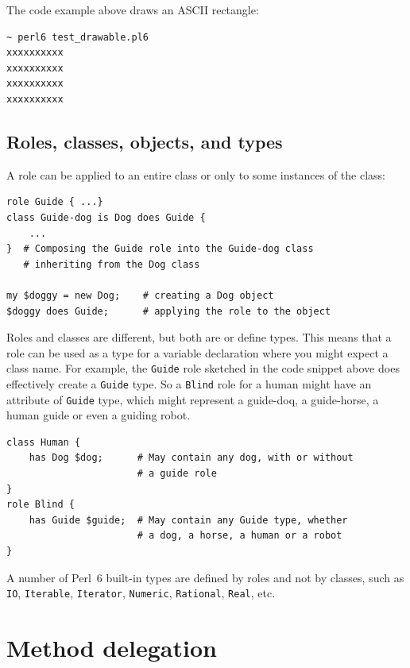 The code example above draws an ASCII rectangle:
\begin{verbatim}
~ perl6 test_drawable.pl6
xxxxxxxxxx
xxxxxxxxxx
xxxxxxxxxx
xxxxxxxxxx
\end{verbatim}

\subsection{Roles, classes, objects, and types}

A role can be applied to an entire class or only to some 
instances of the class:

\begin{verbatim}
role Guide { ...}
class Guide-dog is Dog does Guide { 
    ... 
}  # Composing the Guide role into the Guide-dog class
   # inheriting from the Dog class

my $doggy = new Dog;    # creating a Dog object
$doggy does Guide;      # applying the role to the object
\end{verbatim}

Roles and classes are different, but both are or define types.
This means that a role can be used as a type for a variable 
declaration where you might expect a class name. For example, 
the {\tt Guide} role sketched in the code snippet above does 
effectively create a {\tt Guide} type. So a {\tt Blind} role for 
a human might have an attribute of {\tt Guide} type, which 
might represent a guide-doq, a guide-horse, a human guide or 
even a guiding robot.

\begin{verbatim}
class Human {
    has Dog $dog;      # May contain any dog, with or without
                       # a guide role
}
role Blind {
    has Guide $guide;  # May contain any Guide type, whether 
                       # a dog, a horse, a human or a robot
}
\end{verbatim}

A number of Perl~6 built-in types are defined by roles and 
not by classes, such as {\tt IO}, {\tt Iterable}, 
{\tt Iterator}, {\tt Numeric}, {\tt Rational}, {\tt Real},
etc.

\section{Method delegation}

